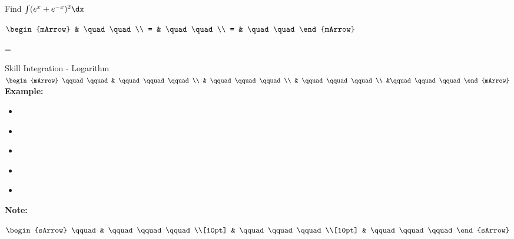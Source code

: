 \begin{mtask}
   \task \begin{exercise} Find $\int (e^{x} + e^{-x})^{2} \dx$
           \begin{envSolution}
             $\begin{mArrow}
                   & \quad \quad              \\
		   		 = & \quad \quad              \\
				 = & \quad \quad 
              \end{mArrow}$
            \begin{shortsolution}  
			     =$ \quad \quad \quad \quad$
			\end{shortsolution}				 
           \end{envSolution}
         \end{exercise}

\end{mtask}

\pShortSolutionSubsection
\printshortsolutions


\clearpage
{}
\begin{boxSkill}{Skill \thenskill \quad Integration - Logarithm}
    \noindent%
	 $\begin{mArrow}
        \qquad \qquad &    \qquad\qquad\qquad          \\
                      & \qquad\qquad\qquad \\
			          & \qquad\qquad\qquad  \\
			          &\qquad\qquad\qquad
 	 \end{mArrow}$\\[0.5cm]
	 

	\textbf{Example:}
	\begin{itemize}[leftmargin=0.8cm]
	     \item[] $\qquad\qquad\qquad    $
	     \item[] $\qquad\qquad\qquad     $
	     \item[] $\qquad\qquad\qquad      $ 
	     \item[] $\qquad\qquad\qquad    $
	     \item[] $\qquad\qquad\qquad  $	 
	\end{itemize}
	
	\tcbline
	
    \textbf{Note:}\\[0.6cm]
	\begin{warningEnv}
	    $\begin{sArrow}
	        \qquad   & \qquad\qquad\qquad \\[10pt]
	  	             & \qquad\qquad\qquad             \\[10pt] 
                     & \qquad\qquad\qquad 				   
		 \end{sArrow}$		   
    \end{warningEnv}
\end{boxSkill}



